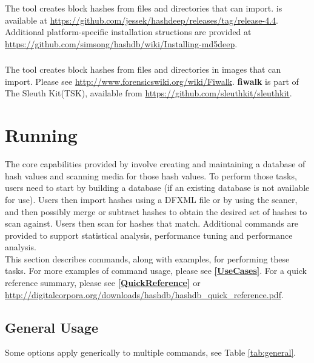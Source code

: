 \documentclass[11pt,fleqn]{article} %
\begin{document}
\subsubsection{\mdd}
The \mdd tool creates block hashes from files and directories that \hash can import.
\mdd is available at
\url{https://github.com/jessek/hashdeep/releases/tag/release-4.4}.
Additional platform-specific installation structions are provided at
\url{https://github.com/simsong/hashdb/wiki/Installing-md5deep}.\\

\subsubsection{\fiwalk}
The \fiwalk tool creates block hashes from files and directories in images that \hash can import.
Please see \url{http://www.forensicswiki.org/wiki/Fiwalk}.
\textbf{fiwalk} is part of The Sleuth Kit\textregistered\xspace (TSK),
available from \url{https://github.com/sleuthkit/sleuthkit}. \\

\section {Running \hash}
\label{Running}
The core capabilities provided by \hash involve creating and maintaining a database of hash values and scanning media for those hash values. To perform those tasks, \hash users need to start by building a database (if an existing database is not available for use).
Users then import hashes using a DFXML file or by using the \bulk \hash scaner, and then possibly merge or subtract hashes to obtain the desired set of hashes to scan against.
Users then scan for hashes that match.
Additional commands are provided to support statistical analysis, performance tuning and performance analysis.\\

This section describes \hash commands, along with examples, for performing these tasks.
For more examples of command usage, please see \textbf{\autoref{UseCases}}.
For a \hash quick reference summary, please see \textbf{\autoref{QuickReference}}
or \url{http://digitalcorpora.org/downloads/hashdb/hashdb_quick_reference.pdf}.

\subsection{General Usage}
Some options apply generically to multiple commands,
see Table \ref{tab:general}.\\
\end{document}
